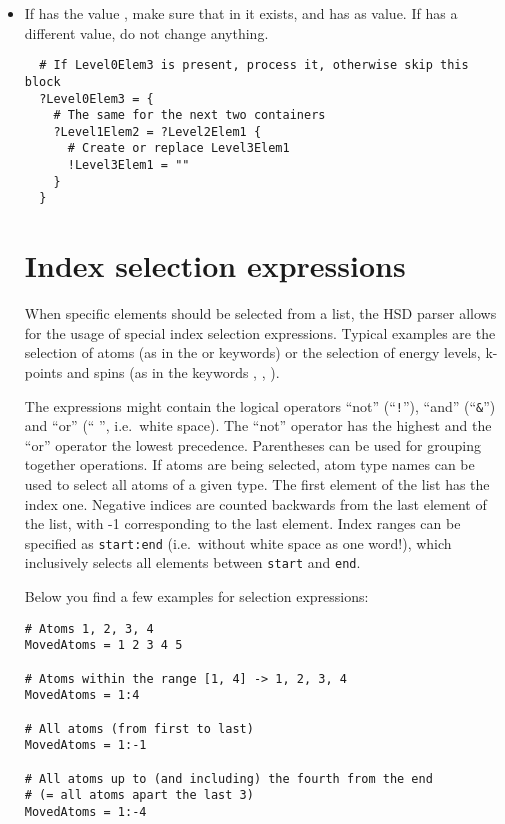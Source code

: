 \begin{itemize}
\item If  has the value , make sure
  that  in it exists, and has  as value. If
   has a different value, do not change anything.
\begin{verbatim}
  # If Level0Elem3 is present, process it, otherwise skip this block
  ?Level0Elem3 = {
    # The same for the next two containers
    ?Level1Elem2 = ?Level2Elem1 {
      # Create or replace Level3Elem1
      !Level3Elem1 = ""
    }
  }
\end{verbatim}


\section{Index selection expressions}
\label{sec:index_selection}

When specific elements should be selected from a list, the HSD parser allows for the usage of
special index selection expressions.  Typical examples are the selection of atoms (as in the
 or  keywords) or the selection of energy levels, k-points and spins (as in
the \waveplot{} keywords , , ).

The expressions might contain the logical operators ``not'' (``\verb|!|''), ``and'' (``\verb|&|'')
and ``or'' (`` '', i.e.\ white space). The ``not'' operator has the highest and the ``or'' operator
the lowest precedence. Parentheses can be used for grouping together operations. If atoms are being
selected, atom type names can be used to select all atoms of a given type. The first element of the
list has the index one. Negative indices are counted backwards from the last element of the list,
with -1 corresponding to the last element. Index ranges can be specified as \verb|start:end| (i.e.\
without white space as one word!), which inclusively selects all elements between \verb|start| and
\verb|end|.

Below you find a few examples for selection expressions:

\begin{verbatim}
# Atoms 1, 2, 3, 4
MovedAtoms = 1 2 3 4 5

# Atoms within the range [1, 4] -> 1, 2, 3, 4
MovedAtoms = 1:4

# All atoms (from first to last)
MovedAtoms = 1:-1

# All atoms up to (and including) the fourth from the end
# (= all atoms apart the last 3)
MovedAtoms = 1:-4


\end{verbatim}
\end{itemize}
